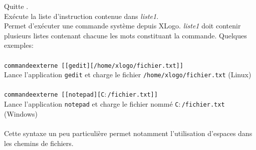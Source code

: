 Quitte \xlogo.\\
Exécute la liste d'instruction contenue dans \textit{liste1}. \\
Permet d'exécuter une commande système depuis XLogo. \textit{liste1} doit contenir plusieurs listes contenant chacune les mots constituant la commande. Quelques exemples:\\ \\
\texttt{commandeexterne [[gedit][/home/xlogo/fichier.txt]]}\\
Lance l'application \texttt{gedit} et charge le fichier \texttt{/home/xlogo/fichier.txt} (Linux)\\ \\
\texttt{commandeexterne [[notepad][C$\colon$/fichier.txt]]}\\
Lance l'application \texttt{notepad} et charge le fichier nommé \texttt{C$\colon$/fichier.txt} (Windows)\\ \\
Cette syntaxe un peu particulière permet notamment l'utilisation d'espaces dans les chemins de fichiers.
